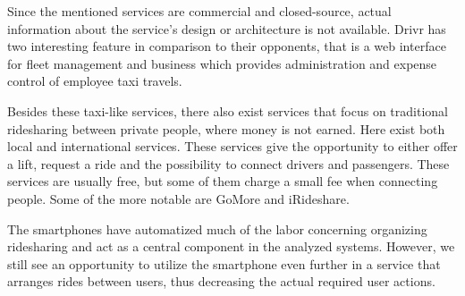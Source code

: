 Since the mentioned services are commercial and closed-source, actual information about the service's design or architecture is not available.
Drivr has two interesting feature in comparison to their opponents, that is a web interface for fleet management and business which provides administration and expense control of employee taxi travels.

Besides these taxi-like services, there also exist services that focus on traditional ridesharing between private people, where money is not earned.
Here exist both local and international services. 
These services give the opportunity to either offer a lift, request a ride and the possibility to connect drivers and passengers.
These services are usually free, but some of them charge a small fee when connecting people.
Some of the more notable are GoMore and iRideshare.

The smartphones have automatized much of the labor concerning organizing ridesharing and act as a central component in the analyzed systems.
However, we still see an opportunity to utilize the smartphone even further in a service that arranges rides between users, thus decreasing the actual required user actions.